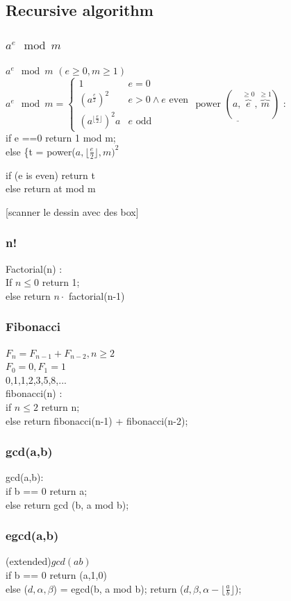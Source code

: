 \documentclass[12pt,a4paper]{article}
\begin{document}
\subsection{Recursive algorithm}
\subsubsection{$a^e \mod m$}
\underline{$a^e \mod m$} $(e \geq 0, m \geq 1)$\\
$a^e \mod m = 
\left\{
\begin{array}{ll}
1 & e=0\\
(a^{\frac{e}{2}})^2 & e > 0 \wedge e \mbox{ even}\\
(a^{\lfloor\frac{e}{2}\rfloor})^2a & e \mbox{ odd}
\end{array}
\right.
$
$\underline{\mbox{power } (a, \overbrace{e}^{\geq 0}, \overbrace{m}^{\geq 1})}$ : \\
if e ==0 return  1 mod m;\\
else \{t = power($a, \lfloor\frac{e}{2}\rfloor, m)^2$

if (e is even) return t\\
else return at mod m

[scanner le dessin avec des box]
\subsubsection{n!}
Factorial(n) :\\
If $n \leq 0$ return 1;\\
else return $n\cdot$ factorial(n-1)
\subsubsection{Fibonacci}
$F_n = F_{n-1} + F_{n-2}, n \geq 2$\\
$F_0 = 0, F_1 = 1$\\
0,1,1,2,3,5,8,...\\
fibonacci(n) :\\
if $n \leq 2$ return n;\\
else return fibonacci(n-1) + fibonacci(n-2);
\subsubsection{gcd(a,b)}
gcd(a,b):\\
if b == 0 return a;\\
else return gcd (b, a mod b);
\subsubsection{egcd(a,b)}
(extended)$gcd(ab)$\\
if b == 0 return (a,1,0)\\
else ($d, \alpha, \beta$) = egcd(b, a mod b);
return ($d, \beta, \alpha- \lfloor\frac{a}{b}\rfloor$);
\end{document}
